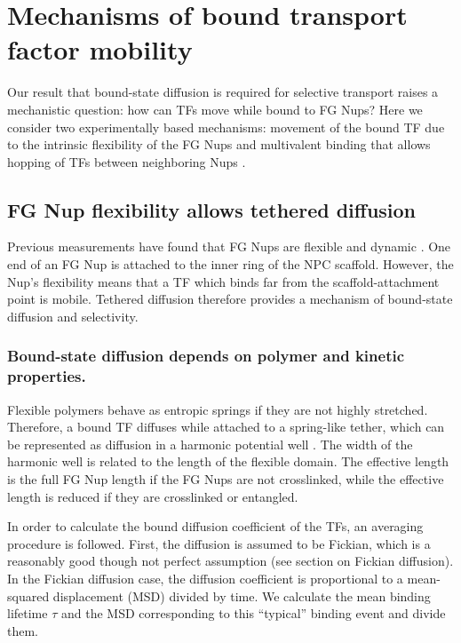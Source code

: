 \section{Mechanisms of  bound transport factor mobility}

Our result that bound-state diffusion is required for selective transport raises a mechanistic question: how can TFs move while bound to FG Nups? Here we consider two experimentally based mechanisms: movement of the bound TF due to the intrinsic flexibility of the FG Nups \cite{patel07} and multivalent binding that allows hopping of TFs between neighboring Nups \cite{raveh16}.

\subsection{FG Nup flexibility allows tethered diffusion}
Previous measurements have found that FG Nups are flexible and dynamic \cite{lim07, milles14, hough15}.  One end of an FG Nup is attached to the inner ring of the NPC scaffold.  However, the Nup's flexibility means that a TF which binds far from the scaffold-attachment point is mobile.  Tethered diffusion therefore provides a mechanism of bound-state diffusion and selectivity.

\subsubsection{Bound-state diffusion depends on polymer and kinetic properties.}
Flexible polymers behave as entropic springs \cite{howard01} if they are not highly stretched. Therefore, a bound TF diffuses while attached to a spring-like tether, which can be represented as diffusion in a harmonic potential well .  The width of the harmonic well is related to the length of the flexible domain.  The effective length is the full FG Nup length if the FG Nups are not crosslinked, while the effective length is reduced if they are crosslinked or entangled\cite{ribbeck01}.  

In order to calculate the bound diffusion coefficient of the TFs, an averaging procedure is followed.  First, the diffusion is assumed to be Fickian, which is a reasonably good though not perfect assumption (see section on Fickian diffusion).  In the Fickian diffusion case, the diffusion coefficient is proportional to a mean-squared displacement (MSD) divided by time.  We calculate the mean binding lifetime $\tau$ and the MSD corresponding to this ``typical'' binding event and divide them.

